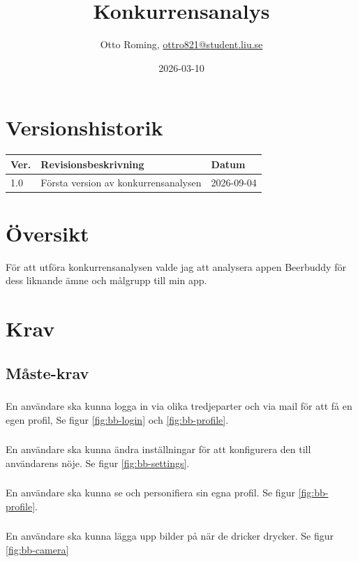 \documentclass{TDP003mall}
\author{Otto Roming, \url{ottro821@student.liu.se}}
\title{Konkurrensanalys}
\date{2026-03-10}
\begin{document}
\projectpage
\section{Versionshistorik}
\begin{table}[!h]
\begin{tabularx}{\linewidth}{|l|X|l|}
\hline
Ver. & Revisionsbeskrivning & Datum \\\hline
1.0 & Första version av konkurrensanalysen & 2026-09-04 \\\hline
\end{tabularx}
\end{table}

\section{Översikt}
För att utföra konkurrensanalysen valde jag att analysera appen Beerbuddy för dess liknande ämne och målgrupp till min app.

\section{Krav}
\subsection{Måste-krav}
\subsubsection{}
En användare ska kunna logga in via olika tredjeparter och via mail för att få en egen profil, Se figur \ref{fig:bb-login} och \ref{fig:bb-profile}.

\subsubsection{}
En användare ska kunna ändra inställningar för att konfigurera den till användarens nöje. Se figur \ref{fig:bb-settings}.

\subsubsection{}
En användare ska kunna se och personifiera sin egna profil. Se figur \ref{fig:bb-profile}.

\subsubsection{}
En användare ska kunna lägga upp bilder på när de dricker drycker. Se figur \ref{fig:bb-camera}
\end{document}
